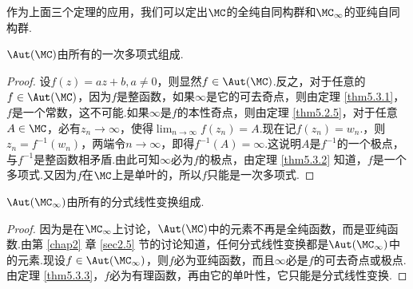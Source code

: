 作为上面三个定理的应用，我们可以定出$\MC$的全纯自同构群和$\MC_\infty$的亚纯自同构群.
\begin{theorem}\label{thm5.3.4}
$\Aut(\MC)$由所有的一次多项式组成.
\end{theorem}
\begin{proof}
设$f(z)=az+b,a\ne0$，则显然$f\in \Aut(\MC)$.反之，对于任意的$f\in \Aut(\MC)$，因为$f$是整函数，如果$\infty$是它的可去奇点，则由定理 \ref{thm5.3.1}，$f$是一个常数，这不可能.如果$\infty$是$f$的本性奇点，则由定理 \ref{thm5.2.5}，对于任意$A\in\MC$，必有$z_n\to\infty$，使得$\lim_{n\to\infty}f(z_n)=A$.现在记$f(z_n)=w_n$.，则$z_n=f^{-1}(w_n)$，两端令$n\to\infty$，即得$f^{-1}(A)=\infty$.这说明$A$是$f^{-1}$的一个极点，与$f^{-1}$是整函数相矛盾.由此可知$\infty$必为$f$的极点，由定理 \ref{thm5.3.2} 知道，$f$是一个多项式.又因为$f$在$\MC$上是单叶的，所以$f$只能是一次多项式.
\end{proof}

\begin{theorem}\label{thm5.3.5}
$\Aut(\MC_\infty)$由所有的分式线性变换组成.
\end{theorem}
\begin{proof}
因为是在$\MC_\infty$上讨论，$\Aut(\MC)$中的元素不再是全纯函数，而是亚纯函数.由第 \ref{chap2} 章 \ref{sec2.5} 节的讨论知道，任何分式线性变换都是$\Aut(\MC_\infty)$中的元素.现设$f\in\Aut(\MC_\infty)$，则$f$必为亚纯函数，而且$\infty$必是$f$的可去奇点或极点.由定理 \ref{thm5.3.3}，$f$必为有理函数，再由它的单叶性，它只能是分式线性变换.
\end{proof}

